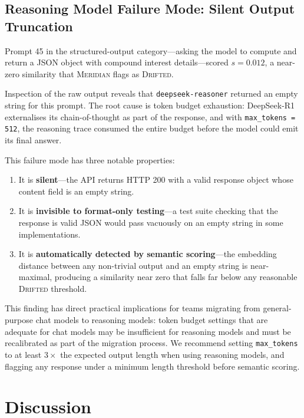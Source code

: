 \documentclass[11pt,a4paper]{article}
\begin{document}
\subsection{Reasoning Model Failure Mode: Silent Output Truncation}
\label{sec:outlier}

Prompt 45 in the structured-output category---asking the model to compute and
return a JSON object with compound interest details---scored $s = 0.012$,
a near-zero similarity that \textsc{Meridian} flags as \textsc{Drifted}.

Inspection of the raw output reveals that \texttt{deepseek-reasoner} returned
an empty string for this prompt.
The root cause is token budget exhaustion: DeepSeek-R1 externalises its
chain-of-thought as part of the response, and with \texttt{max\_tokens = 512},
the reasoning trace consumed the entire budget before the model could emit
its final answer.

This failure mode has three notable properties:
\begin{enumerate}
  \item It is \textbf{silent}---the API returns HTTP 200 with a valid response
    object whose content field is an empty string.
  \item It is \textbf{invisible to format-only testing}---a test suite checking
    that the response is valid JSON would pass vacuously on an empty string in
    some implementations.
  \item It is \textbf{automatically detected by semantic scoring}---the embedding
    distance between any non-trivial output and an empty string is near-maximal,
    producing a similarity near zero that falls far below any reasonable
    \textsc{Drifted} threshold.
\end{enumerate}

This finding has direct practical implications for teams migrating from
general-purpose chat models to reasoning models: token budget settings that are
adequate for chat models may be insufficient for reasoning models and must be
recalibrated as part of the migration process.
We recommend setting \texttt{max\_tokens} to at least $3\times$ the expected
output length when using reasoning models, and flagging any response under
a minimum length threshold before semantic scoring.

\section{Discussion}
\end{document}
